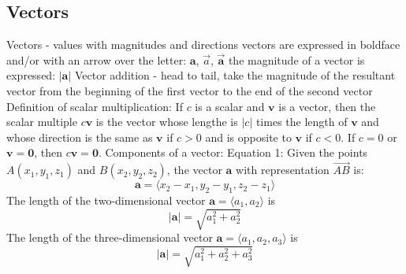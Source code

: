 \documentclass{article}
\begin{document}
    \subsection{Vectors}
    \begin{outline}
        \1 Vectors - values with magnitudes and directions
        \1 vectors are expressed in boldface and/or with an arrow over the letter: \(\mathbf{a}\), \(\vec{a}\), \(\vec{\mathbf{a}}\)
        \1 the magnitude of a vector is expressed: \(|\mathbf{a}|\)
        \1 Vector addition - head to tail, take the magnitude of the resultant vector from the beginning of the first vector to the end of the second vector 
        \1 Definition of scalar multiplication: If $c$ is a scalar and $\mathbf{v}$ is a vector, then the scalar multiple \(c\mathbf v\) is the vector whose lengthe is \(|c|\) times the length of \(\mathbf v\) and whose direction is the same as \(\mathbf v\) if \(c>0\) and is opposite to \(\mathbf v\) if \(c<0\). If \(c=0\) or \(\mathbf{v=0}\), then \(c\mathbf{v=0}\). 
        \1 Components of a vector: Equation 1: Given the points \(A(x_1,y_1,z_1)\) and \(B(x_2,y_2,z_2)\), the vector \(\mathbf a\) with representation \(\vec{AB}\) is: \[\mathbf a=\langle x_2-x_1, y_2-y_1,z_2-z_1\rangle\]
        \1 The length of the two-dimensional vector \(\mathbf a=\langle a_1,a_2\rangle\) is \[|\mathbf a|=\sqrt{a^2_1+a_2^2}\]
        \1 The length of the three-dimensional vector \(\mathbf a=\langle a_1,a_2,a_3\rangle\) is \[|\mathbf a|=\sqrt{a^2_1+a_2^2+a_3^2}\]
    \end{outline}
\end{document}
